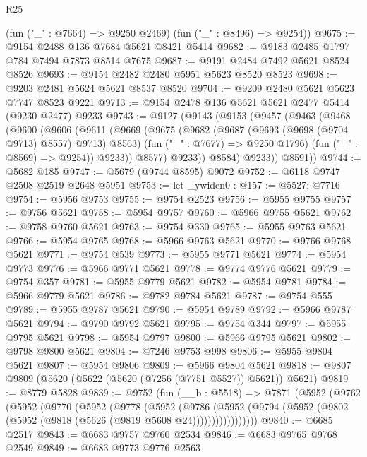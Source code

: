\begin{lexlean}{R25}
\begin{coremodule}
      (fun ("_" : @7664) => @9250 @2469)
      (fun ("_" : @8496) => @9254))
@9675 := @9154 @2488 @136 @7684 @5621 @8421 @5414
@9682 := @9183 @2485 @1797 @784 @7494 @7873 @8514 @7675
@9687 := @9191 @2484 @7492 @5621 @8524 @8526
@9693 := @9154 @2482 @2480 @5951 @5623 @8520 @8523
@9698 := @9203 @2481 @5624 @5621 @8537 @8520
@9704 := @9209 @2480 @5621 @5623 @7747 @8523 @9221
@9713 := @9154 @2478 @136 @5621 @5621 @2477 @5414 (@9230 @2477) @9233
@9743 := @9127
    (@9143
      (@9153
        (@9457
          (@9463
            (@9468
              (@9600
                (@9606
                  (@9611
                    (@9669
                      (@9675
                        (@9682
                          (@9687 (@9693 (@9698 (@9704 @9713) @8557) @9713) @8563)
                          (fun ("_" : @7677) => @9250 @1796)
                          (fun ("_" : @8569) => @9254))
                        @9233))
                    @8577)
                  @9233))
              @8584)
            @9233))
        @8591))
@9744 := @5682 @185
@9747 := @5679 (@9744 @8595) @9072
@9752 := @6118 @9747 @2508 @2519 @2648 @5951
@9753 := let _ywiden0 : @157 := @5527; @7716
@9754 := @5956 @9753
@9755 := @9754 @2523
@9756 := @5955 @9755
@9757 := @9756 @5621
@9758 := @5954 @9757
@9760 := @5966 @9755 @5621
@9762 := @9758 @9760 @5621
@9763 := @9754 @330
@9765 := @5955 @9763 @5621
@9766 := @5954 @9765
@9768 := @5966 @9763 @5621
@9770 := @9766 @9768 @5621
@9771 := @9754 @539
@9773 := @5955 @9771 @5621
@9774 := @5954 @9773
@9776 := @5966 @9771 @5621
@9778 := @9774 @9776 @5621
@9779 := @9754 @357
@9781 := @5955 @9779 @5621
@9782 := @5954 @9781
@9784 := @5966 @9779 @5621
@9786 := @9782 @9784 @5621
@9787 := @9754 @555
@9789 := @5955 @9787 @5621
@9790 := @5954 @9789
@9792 := @5966 @9787 @5621
@9794 := @9790 @9792 @5621
@9795 := @9754 @344
@9797 := @5955 @9795 @5621
@9798 := @5954 @9797
@9800 := @5966 @9795 @5621
@9802 := @9798 @9800 @5621
@9804 := @7246 @9753 @998
@9806 := @5955 @9804 @5621
@9807 := @5954 @9806
@9809 := @5966 @9804 @5621
@9818 := @9807 @9809 (@5620 (@5622 (@5620 (@7256 (@7751 @5527)) @5621)) @5621)
@9819 := @8779 @5828
@9839 := @9752
    (fun (__b : @5518) =>
    @7871
      (@5952
        (@9762
          (@5952
            (@9770
              (@5952
                (@9778
                  (@5952
                    (@9786
                      (@5952
                        (@9794 (@5952 (@9802 (@5952 (@9818 (@5626 (@9819 @5608 @24)))))))))))))))))
@9840 := @6685 @2517
@9843 := @6683 @9757 @9760 @2534
@9846 := @6683 @9765 @9768 @2549
@9849 := @6683 @9773 @9776 @2563

\end{coremodule}
\end{lexlean}
